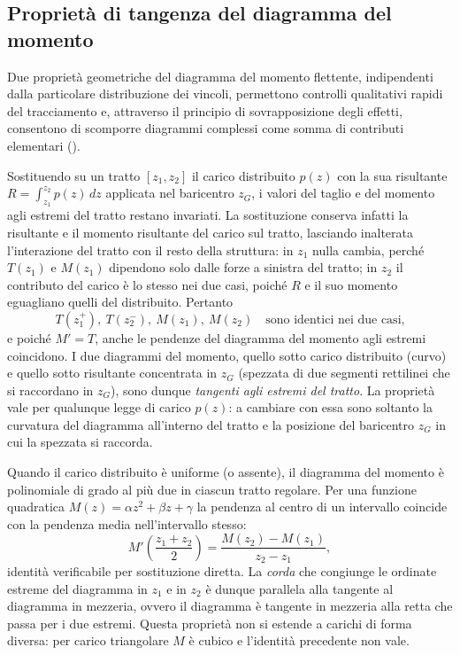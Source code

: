 \subsection{Proprietà di tangenza del diagramma del momento}
\label{sec:tangenze_momento}

Due proprietà geometriche del diagramma del momento
flettente, indipendenti dalla particolare distribuzione
dei vincoli, permettono controlli qualitativi rapidi
del tracciamento e, attraverso il principio di
sovrapposizione degli effetti, consentono di scomporre
diagrammi complessi come somma di contributi
elementari ().






Sostituendo su un tratto $[z_1, z_2]$ il carico
distribuito $p(z)$ con la sua risultante
$R = \int_{z_1}^{z_2} p(z)\,dz$ applicata nel baricentro
$z_G$, i valori del taglio e del momento agli estremi
del tratto restano invariati. La sostituzione conserva
infatti la risultante e il momento risultante del carico
sul tratto, lasciando inalterata l'interazione del
tratto con il resto della struttura: in $z_1$ nulla
cambia, perché $T(z_1)$ e $M(z_1)$ dipendono solo dalle
forze a sinistra del tratto; in $z_2$ il contributo del
carico è lo stesso nei due casi, poiché $R$ e il suo
momento eguagliano quelli del distribuito. Pertanto
\[
T(z_1^+), \ T(z_2^-), \ M(z_1), \ M(z_2)
\quad\text{sono identici nei due casi,}
\]
e poiché $M' = T$, anche le pendenze del diagramma del
momento agli estremi coincidono. I due diagrammi del
momento, quello sotto carico distribuito (curvo) e
quello sotto risultante concentrata in $z_G$ (spezzata
di due segmenti rettilinei che si raccordano in $z_G$),
sono dunque \emph{tangenti agli estremi del tratto}.
La proprietà vale per qualunque legge di carico $p(z)$:
a cambiare con essa sono soltanto la curvatura del
diagramma all'interno del tratto e la posizione del
baricentro $z_G$ in cui la spezzata si raccorda.

Quando il carico distribuito è uniforme (o assente),
il diagramma del momento è polinomiale di grado al più
due in ciascun tratto regolare. Per una funzione
quadratica $M(z) = \alpha z^2 + \beta z + \gamma$ la
pendenza al centro di un intervallo coincide con la
pendenza media nell'intervallo stesso:
\[
M'\!\left(\frac{z_1+z_2}{2}\right)
= \frac{M(z_2)-M(z_1)}{z_2-z_1},
\]
identità verificabile per sostituzione diretta. La
\emph{corda} che congiunge le ordinate estreme del
diagramma in $z_1$ e in $z_2$ è dunque parallela alla
tangente al diagramma in mezzeria, ovvero il
diagramma è tangente in mezzeria alla retta che
passa per i due estremi. Questa proprietà non si
estende a carichi di forma diversa: per carico
triangolare $M$ è cubico e l'identità precedente
non vale.


